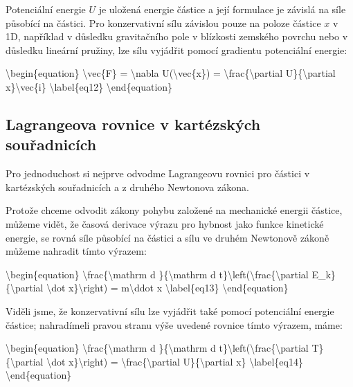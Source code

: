 \documentclass[letterpaper,10pt,english]{jupyterBook}
\begin{document}
\sphinxAtStartPar
Potenciální energie \(U\) je uložená energie částice a její formulace je závislá na síle působící na částici. Pro konzervativní sílu závislou pouze na poloze částice \(x\) v 1D, například v důsledku gravitačního pole v blízkosti zemského povrchu nebo v důsledku lineární pružiny, lze sílu vyjádřit pomocí gradientu potenciální energie:

\sphinxAtStartPar
\textbackslash{}begin\{equation\}
\textbackslash{}vec\{F\} = \sphinxhyphen{}\textbackslash{}nabla U(\textbackslash{}vec\{x\}) = \sphinxhyphen{}\textbackslash{}frac\{\textbackslash{}partial U\}\{\textbackslash{}partial x\}\textbackslash{}vec\{i\}
\textbackslash{}label\{eq12\}
\textbackslash{}end\{equation\}


\subsection{Lagrangeova rovnice v kartézských souřadnicích}
\label{\detokenize{Prednasky/1_5_Lagrange_Eulerovy_rovnice:lagrangeova-rovnice-v-kartezskych-souradnicich}}
\sphinxAtStartPar
Pro jednoduchost si nejprve odvodme Lagrangeovu rovnici pro částici v kartézských souřadnicích a z druhého Newtonova zákona.

\sphinxAtStartPar
Protože chceme odvodit zákony pohybu založené na mechanické energii částice, můžeme vidět, že časová derivace výrazu pro hybnost jako funkce kinetické energie, se rovná síle působící na částici a sílu ve druhém Newtonově zákoně můžeme nahradit tímto výrazem:

\sphinxAtStartPar
\textbackslash{}begin\{equation\}
\textbackslash{}frac\{\textbackslash{}mathrm d \}\{\textbackslash{}mathrm d t\}\textbackslash{}left(\textbackslash{}frac\{\textbackslash{}partial E\_k\}\{\textbackslash{}partial \textbackslash{}dot x\}\textbackslash{}right) = m\textbackslash{}ddot x
\textbackslash{}label\{eq13\}
\textbackslash{}end\{equation\}

\sphinxAtStartPar
Viděli jsme, že konzervativní sílu lze vyjádřit také pomocí potenciální energie částice; nahradíme\sphinxhyphen{}li pravou stranu výše uvedené rovnice tímto výrazem, máme:

\sphinxAtStartPar
\textbackslash{}begin\{equation\}
\textbackslash{}frac\{\textbackslash{}mathrm d \}\{\textbackslash{}mathrm d t\}\textbackslash{}left(\textbackslash{}frac\{\textbackslash{}partial T\}\{\textbackslash{}partial \textbackslash{}dot x\}\textbackslash{}right) = \sphinxhyphen{}\textbackslash{}frac\{\textbackslash{}partial U\}\{\textbackslash{}partial x\}
\textbackslash{}label\{eq14\}
\textbackslash{}end\{equation\}
\end{document}
